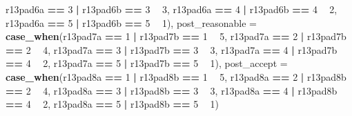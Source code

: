 \documentclass[]{book}
\newenvironment{Shaded}{\begin{snugshade}}{\end{snugshade}}
\newcommand{\KeywordTok}[1]{\textcolor[rgb]{0.13,0.29,0.53}{\textbf{#1}}}
\newcommand{\DataTypeTok}[1]{\textcolor[rgb]{0.13,0.29,0.53}{#1}}
\newcommand{\DecValTok}[1]{\textcolor[rgb]{0.00,0.00,0.81}{#1}}
\newcommand{\StringTok}[1]{\textcolor[rgb]{0.31,0.60,0.02}{#1}}
\newcommand{\OperatorTok}[1]{\textcolor[rgb]{0.81,0.36,0.00}{\textbf{#1}}}
\newcommand{\NormalTok}[1]{#1}
\begin{document}
\begin{Shaded}
\begin{Highlighting}[]
{{{{{{{\NormalTok{                          r13pad6a }\OperatorTok{==}\StringTok{ }\DecValTok{3} \OperatorTok{|}\StringTok{ }\NormalTok{r13pad6b }\OperatorTok{==}\StringTok{ }\DecValTok{3} \OperatorTok{~}\StringTok{ }\DecValTok{3}\NormalTok{,}
\NormalTok{                          r13pad6a }\OperatorTok{==}\StringTok{ }\DecValTok{4} \OperatorTok{|}\StringTok{ }\NormalTok{r13pad6b }\OperatorTok{==}\StringTok{ }\DecValTok{4} \OperatorTok{~}\StringTok{ }\DecValTok{2}\NormalTok{,}
\NormalTok{                          r13pad6a }\OperatorTok{==}\StringTok{ }\DecValTok{5} \OperatorTok{|}\StringTok{ }\NormalTok{r13pad6b }\OperatorTok{==}\StringTok{ }\DecValTok{5} \OperatorTok{~}\StringTok{ }\DecValTok{1}\NormalTok{),}
          \DataTypeTok{post_reasonable =} \KeywordTok{case_when}\NormalTok{(r13pad7a }\OperatorTok{==}\StringTok{ }\DecValTok{1} \OperatorTok{|}\StringTok{ }\NormalTok{r13pad7b }\OperatorTok{==}\StringTok{ }\DecValTok{1} \OperatorTok{~}\StringTok{ }\DecValTok{5}\NormalTok{,}
\NormalTok{                          r13pad7a }\OperatorTok{==}\StringTok{ }\DecValTok{2} \OperatorTok{|}\StringTok{ }\NormalTok{r13pad7b }\OperatorTok{==}\StringTok{ }\DecValTok{2} \OperatorTok{~}\StringTok{ }\DecValTok{4}\NormalTok{,}
\NormalTok{                          r13pad7a }\OperatorTok{==}\StringTok{ }\DecValTok{3} \OperatorTok{|}\StringTok{ }\NormalTok{r13pad7b }\OperatorTok{==}\StringTok{ }\DecValTok{3} \OperatorTok{~}\StringTok{ }\DecValTok{3}\NormalTok{,}
\NormalTok{                          r13pad7a }\OperatorTok{==}\StringTok{ }\DecValTok{4} \OperatorTok{|}\StringTok{ }\NormalTok{r13pad7b }\OperatorTok{==}\StringTok{ }\DecValTok{4} \OperatorTok{~}\StringTok{ }\DecValTok{2}\NormalTok{,}
\NormalTok{                          r13pad7a }\OperatorTok{==}\StringTok{ }\DecValTok{5} \OperatorTok{|}\StringTok{ }\NormalTok{r13pad7b }\OperatorTok{==}\StringTok{ }\DecValTok{5} \OperatorTok{~}\StringTok{ }\DecValTok{1}\NormalTok{),}
          \DataTypeTok{post_accept =} \KeywordTok{case_when}\NormalTok{(r13pad8a }\OperatorTok{==}\StringTok{ }\DecValTok{1} \OperatorTok{|}\StringTok{ }\NormalTok{r13pad8b }\OperatorTok{==}\StringTok{ }\DecValTok{1} \OperatorTok{~}\StringTok{ }\DecValTok{5}\NormalTok{,}
\NormalTok{                          r13pad8a }\OperatorTok{==}\StringTok{ }\DecValTok{2} \OperatorTok{|}\StringTok{ }\NormalTok{r13pad8b }\OperatorTok{==}\StringTok{ }\DecValTok{2} \OperatorTok{~}\StringTok{ }\DecValTok{4}\NormalTok{,}
\NormalTok{                          r13pad8a }\OperatorTok{==}\StringTok{ }\DecValTok{3} \OperatorTok{|}\StringTok{ }\NormalTok{r13pad8b }\OperatorTok{==}\StringTok{ }\DecValTok{3} \OperatorTok{~}\StringTok{ }\DecValTok{3}\NormalTok{,}
\NormalTok{                          r13pad8a }\OperatorTok{==}\StringTok{ }\DecValTok{4} \OperatorTok{|}\StringTok{ }\NormalTok{r13pad8b }\OperatorTok{==}\StringTok{ }\DecValTok{4} \OperatorTok{~}\StringTok{ }\DecValTok{2}\NormalTok{,}
\NormalTok{                          r13pad8a }\OperatorTok{==}\StringTok{ }\DecValTok{5} \OperatorTok{|}\StringTok{ }\NormalTok{r13pad8b }\OperatorTok{==}\StringTok{ }\DecValTok{5} \OperatorTok{~}\StringTok{ }\DecValTok{1}\NormalTok{)}

}}}}}}}
\end{Highlighting}
\end{Shaded}
\end{document}
